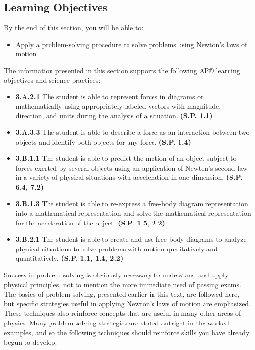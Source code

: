 \documentclass[
]{book}
\providecommand{\tightlist}{%
  \setlength{\itemsep}{0pt}\setlength{\parskip}{0pt}}
\newenvironment{learning-objectives}{}{}
\begin{document}
\hypertarget{fs-id1795639}{}
\begin{learning-objectives}

\hypertarget{learning-objectives-18}{%
\subsection{Learning Objectives}\label{learning-objectives-18}}

By the end of this section, you will be able to:

\begin{itemize}
\tightlist
\item
  Apply a problem-solving procedure to solve problems using Newton's
  laws of motion
\end{itemize}

The information presented in this section supports the following AP®
learning objectives and science practices:

\begin{itemize}
\tightlist
\item
  \textbf{3.A.2.1} The student is able to represent forces in diagrams or
  mathematically using appropriately labeled vectors with magnitude,
  direction, and units during the analysis of a situation. \textbf{(S.P.
  1.1)}
\item
  \textbf{3.A.3.3} The student is able to describe a force as an
  interaction between two objects and identify both objects for any
  force. \textbf{(S.P. 1.4)}
\item
  \textbf{3.B.1.1} The student is able to predict the motion of an object
  subject to forces exerted by several objects using an application of
  Newton's second law in a variety of physical situations with
  acceleration in one dimension. \textbf{(S.P. 6.4, 7.2)}
\item
  \textbf{3.B.1.3} The student is able to re-express a free-body diagram
  representation into a mathematical representation and solve the
  mathematical representation for the acceleration of the object.
  \textbf{(S.P. 1.5, 2.2)}
\item
  \textbf{3.B.2.1} The student is able to create and use free-body diagrams
  to analyze physical situations to solve problems with motion
  qualitatively and quantitatively. \textbf{(S.P. 1.1, 1.4, 2.2)}
\end{itemize}

\end{learning-objectives}

Success in problem solving is obviously necessary to understand and
apply physical principles, not to mention the more immediate need of
passing exams. The basics of problem solving, presented earlier in this
text, are followed here, but specific strategies useful in applying
Newton's laws of motion are emphasized. These techniques also reinforce
concepts that are useful in many other areas of physics. Many
problem-solving strategies are stated outright in the worked examples,
and so the following techniques should reinforce skills you have already
begun to develop.
\end{document}
